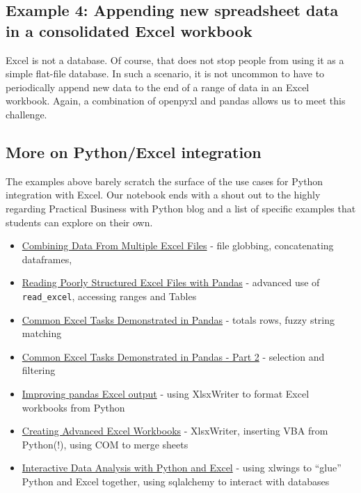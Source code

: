 \documentclass[ited,blindrev]{informs3}              %
\begin{document}
\subsection{Example 4: Appending new spreadsheet data in a consolidated Excel workbook}

Excel is not a database. Of course, that does not stop people from using it as a simple flat-file database. In such a scenario, it is not uncommon to have to periodically append new data to the end of a range of data in an Excel workbook. Again, a combination of openpyxl and pandas allows us to meet this challenge.

\subsection{More on Python/Excel integration}

The examples above barely scratch the surface of the use cases for Python integration with Excel. Our notebook ends with a shout out to the highly regarding Practical Business with Python blog and a list of specific examples that students can explore on their own.

\begin{itemize}
	\item
	\href{https://pbpython.com/excel-file-combine.html}{Combining Data
		From Multiple Excel Files} - file globbing, concatenating dataframes,
	\item
	\href{https://pbpython.com/pandas-excel-range.html}{Reading Poorly
		Structured Excel Files with Pandas} - advanced use of
	\texttt{read\_excel}, accessing ranges and Tables
	\item
	\href{https://pbpython.com/excel-pandas-comp.html}{Common Excel Tasks
		Demonstrated in Pandas} - totals rows, fuzzy string matching
	\item
	\href{https://pbpython.com/excel-pandas-comp-2.html}{Common Excel
		Tasks Demonstrated in Pandas - Part 2} - selection and filtering
	\item
	\href{https://pbpython.com/improve-pandas-excel-output.html}{Improving
		pandas Excel output} - using XlsxWriter to format Excel workbooks from
	Python
	\item
	\href{https://pbpython.com/advanced-excel-workbooks.html}{Creating
		Advanced Excel Workbooks} - XlsxWriter, inserting VBA from Python(!),
	using COM to merge sheets
	\item
	\href{https://pbpython.com/xlwings-pandas-excel.html}{Interactive Data
		Analysis with Python and Excel} - using xlwings to ``glue'' Python and
	Excel together, using sqlalchemy to interact with databases
\end{itemize}
\end{document}

